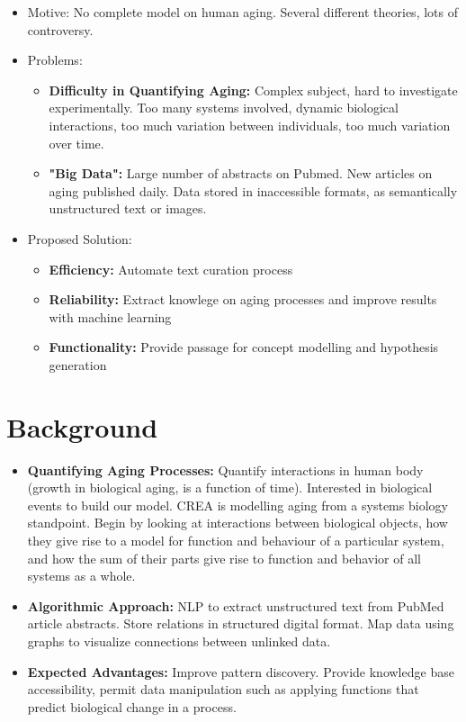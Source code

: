 \documentclass[11pt]{article}
\begin{document}
\begin{itemize}
\item Motive: No complete model on human aging. Several different theories, lots of controversy.
\item Problems:
	\begin{itemize}
		\item \textbf{Difficulty in Quantifying Aging:} Complex subject, hard to investigate experimentally. Too many systems involved, dynamic biological interactions, too much variation between individuals, too much variation over time.
		\item \textbf{"Big Data":} Large number of abstracts on Pubmed. New articles on aging published daily. Data stored in inaccessible formats, as semantically unstructured text or images. 
	\end{itemize}
\item Proposed Solution: 
	\begin{itemize}
		\item \textbf{Efficiency:} Automate text curation process
		\item \textbf{Reliability:} Extract knowlege on aging processes and improve results with machine learning
		\item \textbf{Functionality:} Provide passage for concept modelling and hypothesis generation
	\end{itemize}
\end{itemize}

\section{Background}

\begin{itemize}
\item \textbf{Quantifying Aging Processes:} Quantify interactions in human body (growth in biological aging, is a function of time). Interested in biological events to build our model. CREA is modelling aging from a systems biology standpoint. Begin by looking at interactions between biological objects, how they give rise to a model for function and behaviour of a particular system, and how the sum of their parts give rise to function and behavior of all systems as a whole.  
\item \textbf{Algorithmic Approach:} NLP to extract unstructured text from PubMed article abstracts. Store relations in structured digital format. Map data using graphs to visualize connections between unlinked data.
\item \textbf{Expected Advantages:} Improve pattern discovery. Provide knowledge base accessibility, permit data manipulation such as applying functions that predict biological change in a process. 
\end{itemize}
\end{document}
